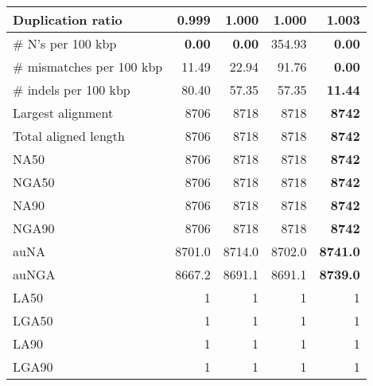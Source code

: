 \documentclass[12pt,a4paper]{article}
\begin{document}
\begin{table}[ht]
\begin{center}
\begin{tabular}{|l*{4}{|r}|}
Duplication ratio & {\bf 0.999} & 1.000 & 1.000 & 1.003 \\ \hline
\# N's per 100 kbp & {\bf 0.00} & {\bf 0.00} & 354.93 & {\bf 0.00} \\ \hline
\# mismatches per 100 kbp & 11.49 & 22.94 & 91.76 & {\bf 0.00} \\ \hline
\# indels per 100 kbp & 80.40 & 57.35 & 57.35 & {\bf 11.44} \\ \hline
Largest alignment & 8706 & 8718 & 8718 & {\bf 8742} \\ \hline
Total aligned length & 8706 & 8718 & 8718 & {\bf 8742} \\ \hline
NA50 & 8706 & 8718 & 8718 & {\bf 8742} \\ \hline
NGA50 & 8706 & 8718 & 8718 & {\bf 8742} \\ \hline
NA90 & 8706 & 8718 & 8718 & {\bf 8742} \\ \hline
NGA90 & 8706 & 8718 & 8718 & {\bf 8742} \\ \hline
auNA & 8701.0 & 8714.0 & 8702.0 & {\bf 8741.0} \\ \hline
auNGA & 8667.2 & 8691.1 & 8691.1 & {\bf 8739.0} \\ \hline
LA50 & 1 & 1 & 1 & 1 \\ \hline
LGA50 & 1 & 1 & 1 & 1 \\ \hline
LA90 & 1 & 1 & 1 & 1 \\ \hline
LGA90 & 1 & 1 & 1 & 1 \\ \hline
\end{tabular}
\end{center}
\end{table}
\end{document}
